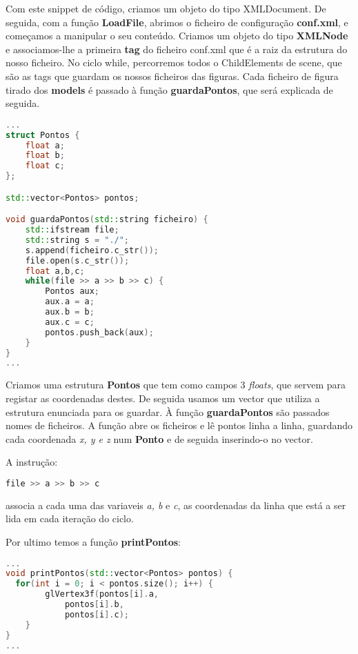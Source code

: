 \documentclass{article}
\begin{document}
Com este snippet de código, criamos um objeto do tipo XMLDocument. De seguida, com a função \textbf{LoadFile}, abrimos o ficheiro de configuração \textbf{conf.xml}, e começamos a manipular o seu conteúdo.
Criamos um objeto do tipo \textbf{XMLNode} e associamos-lhe a primeira \textbf{tag} do ficheiro conf.xml que é a raiz da estrutura do nosso ficheiro.
No ciclo while, percorremos todos o ChildElements de scene, que são as tags que guardam os nossos ficheiros das figuras.
Cada ficheiro de figura tirado dos \textbf{models} é passado à função \textbf{guardaPontos}, que será explicada de seguida.

\begin{file}
	\begin{lstlisting}[language=C++]
...
struct Pontos {
    float a;
    float b;
    float c;
};

std::vector<Pontos> pontos;

void guardaPontos(std::string ficheiro) {
	std::ifstream file;
	std::string s = "./";
	s.append(ficheiro.c_str());
	file.open(s.c_str());
	float a,b,c;
	while(file >> a >> b >> c) {
		Pontos aux;
		aux.a = a;
		aux.b = b;
		aux.c = c;
		pontos.push_back(aux);
	}
}
...
	\end{lstlisting}
\end{file}

Criamos uma estrutura \textbf{Pontos} que tem como campos 3 \textit{floats}, que servem para registar as coordenadas destes. De seguida usamos um vector que utiliza a estrutura enunciada para os guardar.
À função \textbf{guardaPontos} são passados nomes de ficheiros. A função abre os ficheiros e lê pontos linha a linha, guardando cada coordenada \textit{x, y e z} num \textbf{Ponto} e de seguida inserindo-o no vector.

\begin{info} %
	A instrução:
	\begin{lstlisting}[language=C++]
		file >> a >> b >> c
	\end{lstlisting}
	associa a cada uma das variaveis \textit{a, b} e \textit{c}, as coordenadas da linha que está a ser lida em cada iteração do ciclo.
\end{info}

Por ultimo temos a função \textbf{printPontos}:

\begin{file}
	\begin{lstlisting}[language=C++]
...
void printPontos(std::vector<Pontos> pontos) {
  for(int i = 0; i < pontos.size(); i++) {
		glVertex3f(pontos[i].a,
			pontos[i].b, 
			pontos[i].c);
	}
}
...
	\end{lstlisting}
\end{file}
\end{document}
